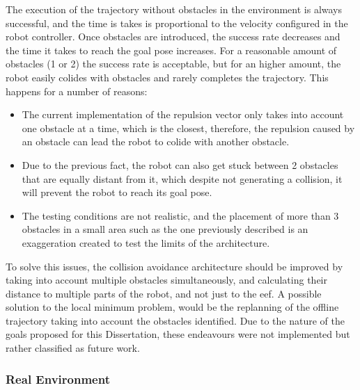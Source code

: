 \par The execution of the trajectory without obstacles in the environment is always successful, and the time is takes is proportional to the velocity configured in the robot controller. Once obstacles are introduced, the success rate decreases and the time it takes to reach the goal pose increases. For a reasonable amount of obstacles (1 or 2) the success rate is acceptable, but for an higher amount, the robot easily colides with obstacles and rarely completes the trajectory. This happens for a number of reasons:

\begin{itemize}
    \item The current implementation of the repulsion vector only takes into account one obstacle at a time, which is the closest, therefore, the repulsion caused by an obstacle can lead the robot to colide with another obstacle.
    \item Due to the previous fact, the robot can also get stuck between 2 obstacles that are equally distant from it, which despite not generating a collision, it will prevent the robot to reach its goal pose.
    \item The testing conditions are not realistic, and the placement of more than 3 obstacles in a small area such as the one previously described is an exaggeration created to test the limits of the architecture.
\end{itemize}


\par To solve this issues, the collision avoidance architecture should be improved by taking into account multiple obstacles simultaneously, and calculating their distance to multiple parts of the robot, and not just to the \ac{eef}. A possible solution to the local minimum problem, would be the replanning of the offline trajectory taking into account the obstacles identified. Due to the nature of the goals proposed for this Dissertation, these endeavours were not implemented but rather classified as future work.



\subsubsection{Real Environment}


